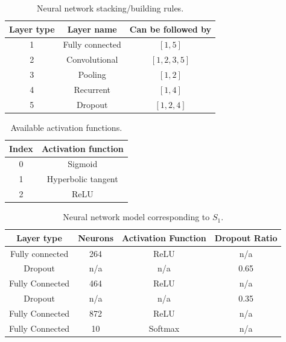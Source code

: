 \documentclass[journal]{IEEEtran}
\begin{document}
\begin{table}[!htb]
\begin{center}
\begin{tabular}{| c | c | c |}
\hline
Layer type & Layer name & Can be followed by \\
\hline
1 & Fully connected & $\left[ 1, 5 \right]$ \\
2 & Convolutional & $\left[ 1, 2, 3, 5 \right]$ \\
3 & Pooling & $\left[ 1, 2 \right]$\\
4 & Recurrent & $\left[ 1, 4 \right]$\\
5 & Dropout & $\left[ 1, 2, 4 \right]$\\
\hline
\end{tabular}
\end{center}
\caption{Neural network stacking/building rules.}
\label{table:neural_network_building_rules}
\end{table}

\begin{table}[!htb]
\begin{center}
\begin{tabular}{| c | c |}
\hline
Index & Activation function \\
\hline
0 & Sigmoid \\
1 & Hyperbolic tangent \\
2 & ReLU \\
\hline
\end{tabular}
\end{center}
\caption{Available activation functions.}
\label{table:index_to_activation_functions}
\end{table}

\begin{table}[!htb]
\begin{center}
\begin{tabular}{| c | c | c | c |}
\hline
Layer type & Neurons & Activation Function & Dropout Ratio \\
\hline
Fully connected & 264 & ReLU & n/a \\
Dropout & n/a & n/a & 0.65 \\
Fully Connected & 464 & ReLU & n/a\\
Dropout & n/a & n/a & 0.35\\
Fully Connected & 872 & ReLU & n/a\\
Fully Connected & 10 & Softmax & n/a\\
\hline
\end{tabular}
\end{center}
\caption{Neural network model corresponding to $S_1$.}
\label{table:neural_network_model_S1}
\end{table}
\end{document}
